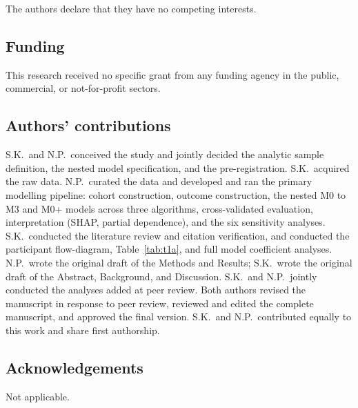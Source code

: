 \documentclass[12pt]{article}
\begin{document}
The authors declare that they have no competing interests.

\subsection*{Funding}

This research received no specific grant from any funding agency in the public, commercial, or not-for-profit sectors.

\subsection*{Authors' contributions}

S.K.\ and N.P.\ conceived the study and jointly decided the analytic sample definition, the nested model specification, and the pre-registration. S.K.\ acquired the raw data. N.P.\ curated the data and developed and ran the primary modelling pipeline: cohort construction, outcome construction, the nested M0 to M3 and M0+ models across three algorithms, cross-validated evaluation, interpretation (SHAP, partial dependence), and the six sensitivity analyses. S.K.\ conducted the literature review and citation verification, and conducted the participant flow-diagram, Table~\ref{tab:t1a}, and full model coefficient analyses. N.P.\ wrote the original draft of the Methods and Results; S.K.\ wrote the original draft of the Abstract, Background, and Discussion. S.K.\ and N.P.\ jointly conducted the analyses added at peer review. Both authors revised the manuscript in response to peer review, reviewed and edited the complete manuscript, and approved the final version. S.K.\ and N.P.\ contributed equally to this work and share first authorship.

\subsection*{Acknowledgements}

Not applicable.
\end{document}
